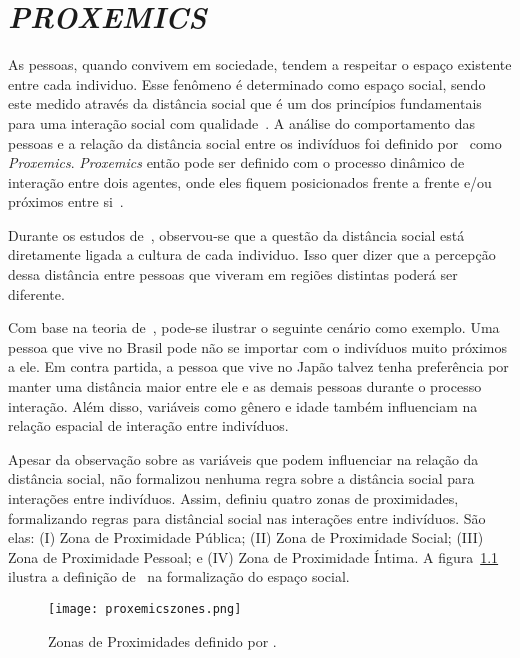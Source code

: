 \chapter{\emph{PROXEMICS}}
\label{cap:proxemics}
As pessoas, quando convivem em sociedade, tendem a respeitar o espaço existente entre cada individuo. Esse fenômeno é determinado como espaço social, sendo este medido através da distância social que é um dos princípios fundamentais para uma interação social com qualidade~\cite{Hall:1969, Henkel:2014}. A análise do comportamento das pessoas e a relação da distância social entre os indivíduos foi definido por~ como \emph{Proxemics}. \emph{Proxemics} então pode ser definido com o processo dinâmico de interação entre dois agentes, onde eles fiquem posicionados frente a frente e/ou próximos entre si~\cite{Mead:2011b}.

Durante os estudos de~, observou-se que a questão da distância social está diretamente ligada a cultura de cada individuo. Isso quer dizer que a percepção dessa distância entre pessoas que viveram em regiões distintas poderá ser diferente.

Com base na teoria de~, pode-se ilustrar o seguinte cenário como exemplo. Uma pessoa que vive no Brasil pode não se importar com o indivíduos muito próximos a ele. Em contra partida, a pessoa que vive no Japão talvez tenha preferência por manter uma distância maior entre ele e as demais pessoas durante o processo interação. Além disso, variáveis como gênero e idade também influenciam na relação espacial de interação entre indivíduos.

Apesar da observação sobre as variáveis que podem influenciar na relação da distância social,  não formalizou nenhuma regra sobre a distância social para interações entre indivíduos. Assim,  definiu quatro zonas de proximidades, formalizando regras para distâncial social nas interações entre indivíduos. São elas: (I) Zona de Proximidade Pública; (II) Zona de Proximidade Social; (III) Zona de Proximidade Pessoal; e (IV) Zona de Proximidade Íntima. A figura~\ref{fig:proximityzones} ilustra a definição de~ na formalização do espaço social.

\begin{figure}[ht!]
	\centering
	\texttt{[image: proxemicszones.png]}
	\caption{Zonas de Proximidades definido por .}
	\label{fig:proximityzones}
\end{figure}

